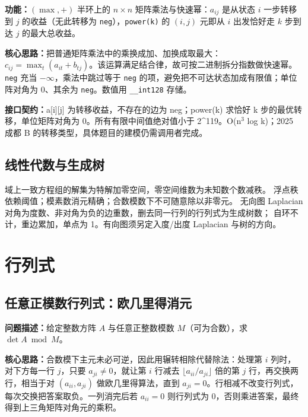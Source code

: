 \noindent\textbf{功能：}\allowbreak $(\max,+)$ 半环上的 $n\times n$ 矩阵乘法与快速幂：$a_{ij}$ 是从状态 $i$ 一步转移到 $j$ 的收益（无此转移为 \texttt{neg}），\texttt{power(k)} 的 $(i,j)$ 元即从 $i$ 出发恰好走 $k$ 步到达 $j$ 的最大总收益。

\textbf{核心思路：}\allowbreak 把普通矩阵乘法中的乘换成加、加换成取最大：$c_{ij}=\max_t(a_{it}+b_{tj})$。该运算满足结合律，故可按二进制拆分指数做快速幂。\texttt{neg} 充当 $-\infty$，乘法中跳过等于 \texttt{neg} 的项，避免把不可达状态加成有限值；单位阵对角为 0、其余为 \texttt{neg}。数值用 \texttt{\_\_int128} 存储。



{\sloppy{}\noindent\textbf{接口契约：}a[i][j] 为转移收益，不存在的边为 neg；power(k) 求恰好 k 步的最优转移，单位矩阵对角为 0。所有有限中间值绝对值小于 2\textasciicircum{}119。O(n$^{3}$ log k)；2025 成都 B 的转移类型，具体题目的建模仍需调用者完成。\par}



\subsection{线性代数与生成树}\label{knowledge-matrix-span}
域上一致方程组的解集为特解加零空间，零空间维数为未知数个数减秩。
浮点秩依赖阈值；模素数消元精确；合数模数下不可随意除以非零元。
无向图 Laplacian 对角为度数、非对角为负的边重数，删去同一行列的行列式为生成树数；
自环不计，重边累加，单点为 1。有向图须另定入度/出度 Laplacian 与树的方向。



\Needspace{604pt}

\section{行列式}

\subsection{任意正模数行列式：欧几里得消元}\label{compact-determinant_mod}

\noindent\textbf{问题描述：}\allowbreak 给定整数方阵 $A$ 与任意正整数模数 $M$（可为合数），求 $\det A\bmod M$。

\textbf{核心思路：}\allowbreak 合数模下主元未必可逆，因此用辗转相除代替除法：处理第 $i$ 列时，对下方每一行 $j$，只要 $a_{ji}\ne0$，就让第 $i$ 行减去 $\lfloor a_{ii}/a_{ji}\rfloor$ 倍的第 $j$ 行，再交换两行，相当于对 $(a_{ii},a_{ji})$ 做欧几里得算法，直到 $a_{ji}=0$。行相减不改变行列式，每次交换把答案取负。一列消完后若 $a_{ii}=0$ 则行列式为 0，否则乘进答案，最终得到上三角矩阵对角元的乘积。



